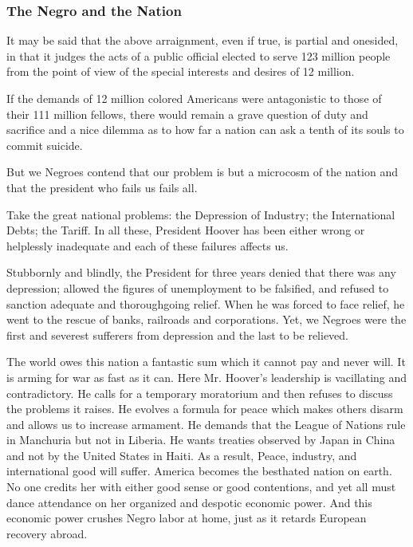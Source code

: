 \documentclass[letterpaper,10pt,english]{jupyterBook}
\begin{document}
\subsubsection{The Negro and the Nation}
\label{\detokenize{Volumes/39/11/herbert_hoover:the-negro-and-the-nation}}
\sphinxAtStartPar
It may be said that the above arraignment, even if true, is partial and one\sphinxhyphen{}sided, in that it judges the acts of a public official elected to serve 123 million people from the point of view of the special interests and desires of 12 million.

\sphinxAtStartPar
If the demands of 12 million colored Americans were antagonistic to those of their 111 million fellows, there would remain a grave question of duty and sacrifice and a nice dilemma as to how far a nation can ask a tenth of its souls to commit suicide.

\sphinxAtStartPar
But we Negroes contend that our problem is but a microcosm of the nation and that the president who fails us fails all.

\sphinxAtStartPar
Take the great national problems: the Depression of Industry; the International Debts; the Tariff. In all these, President Hoover has been either wrong or helplessly inadequate and each of these failures affects us.

\sphinxAtStartPar
Stubbornly and blindly, the President for three years denied that there was any depression; allowed the figures of unemployment to be falsified, and refused to sanction adequate and thorough\sphinxhyphen{}going relief. When he was forced to face relief, he went to the rescue of banks, railroads and corporations. Yet, we Negroes were the first and severest sufferers from depression and the last to be relieved.

\sphinxAtStartPar
The world owes this nation a fantastic sum which it cannot pay and never will. It is arming for war as fast as it can. Here Mr. Hoover’s leadership is vacillating and contradictory. He calls for a temporary moratorium and then refuses to discuss the problems it raises. He evolves a formula for peace which makes others disarm and allows us to increase armament. He demands that the League of Nations rule in Manchuria but not in Liberia. He wants treaties observed by Japan in China and not by the United States in Haiti. As a result, Peace, industry, and international good will suffer. America becomes the best\sphinxhyphen{}hated nation on earth. No one credits her with either good sense or good contentions, and yet all must dance attendance on her organized and despotic economic power. And this economic power crushes Negro labor at home, just as it retards European recovery abroad.
\end{document}
